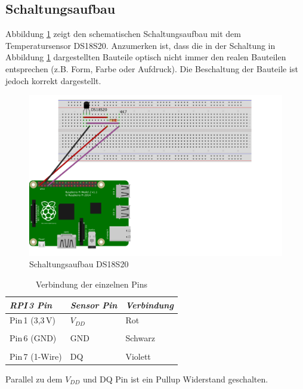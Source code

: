 \subsection{Schaltungsaufbau}
\label{subsection_Schaltungsaufbau_DS18S20}

Abbildung \ref{Abb_Schaltung_DS18S20} zeigt den schematischen Schaltungsaufbau mit dem Temperatursensor DS18S20. Anzumerken ist, dass die in der Schaltung in Abbildung \ref{Abb_Schaltung_DS18S20} dargestellten Bauteile optisch nicht immer den realen Bauteilen entsprechen (z.B. Form, Farbe oder Aufdruck). Die Beschaltung der Bauteile ist jedoch korrekt dargestellt. 

\begin{figure}[!h] 
  \centering
     \includegraphics[scale=.75]{BilderAllgemein/Schaltung_DS18S20.png}
  \caption[Caption for LOF]{Schaltungsaufbau DS18S20\protect\footnotemark}
  \label{Abb_Schaltung_DS18S20}
\end{figure}

\begin{table}[H]
\centering
\begin{tabular}{
lll
}
\toprule

\multicolumn{1}{p{3cm}}{\textit{\ac{RPI}\,3 Pin}} & \multicolumn{1}{p{3cm}}{\textit{Sensor Pin} }&\multicolumn{1}{p{3cm}}{\textit{Verbindung}}\\\midrule
Pin\,1 (3,3\,V) & $V_{DD}$ & Rot\\
&&\\
Pin\,6 (GND) & GND & Schwarz\\
&&\\
Pin\,7 (1-Wire) & DQ & Violett\\

\bottomrule
\end{tabular}
\caption{Verbindung der einzelnen Pins}
\label{Tabelle_Elektrische_Daten_DS18S20}
\end{table}
 Parallel zu dem  $V_{DD}$ und DQ Pin ist ein Pullup Widerstand geschalten.

